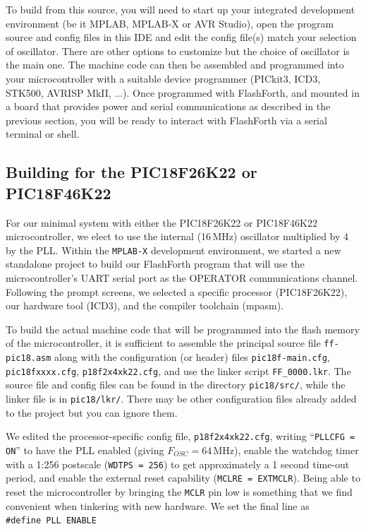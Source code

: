 \documentclass[12pt,a4paper]{article}
\begin{document}
\medskip\noindent
To build from this source, you will need to start up your integrated development environment 
(be it MPLAB, MPLAB-X or AVR Studio), open the program source and config files in this IDE 
and edit the config file(s) match your selection of oscillator.
There are other options to customize but the choice of oscillator is the main one.
The machine code can then be assembled and programmed into your microcontroller with 
a suitable device programmer (PICkit3, ICD3, STK500, AVRISP MkII, ...).
Once programmed with FlashForth, and mounted in a board that provides power and serial
communications as described in the previous section, you will be ready to interact with
FlashForth via a serial terminal or shell.


\medskip
\subsection{Building for the PIC18F26K22 or PIC18F46K22}
%
For our minimal system with either the PIC18F26K22 or PIC18F46K22 microcontroller,
we elect to use the internal (16\,MHz) oscillator multiplied by 4 by the PLL.
Within the \verb!MPLAB-X! development environment, 
we started a new standalone project to build our FlashForth program
that will use the microcontroller's UART serial port as the OPERATOR communications channel.
Following the prompt screens, we selected a specific processor (PIC18F26K22), 
our hardware tool (ICD3), and the compiler toolchain (mpasm).

\medskip\noindent
To build the actual machine code that will be programmed into the flash memory
of the microcontroller,
it is sufficient to assemble the principal source file \verb!ff-pic18.asm!
along with the configuration (or header) files \verb!pic18f-main.cfg!, \verb!pic18fxxxx.cfg!, \verb!p18f2x4xk22.cfg!,
and use the linker script \verb!FF_0000.lkr!.
The source file and config files can be found in the directory \verb!pic18/src/!,
while the linker file is in \verb!pic18/lkr/!.
There may be other configuration files already added to the project but you can ignore them.

\medskip\noindent
We edited the processor-specific config file, \verb!p18f2x4xk22.cfg!, writing ``\verb!PLLCFG = ON!'' 
to have the PLL enabled (giving $F_{OSC} = 64$\,MHz),
enable the watchdog timer with a 1:256 postscale (\verb!WDTPS = 256!) 
to get approximately a 1 second time-out period,
and enable the external reset capability (\verb!MCLRE = EXTMCLR!).
Being able to reset the microcontroller by bringing the \verb!MCLR! pin low is something that
we find convenient when tinkering with new hardware.
We set the final line as \\
\verb!#define PLL ENABLE!
\end{document}
